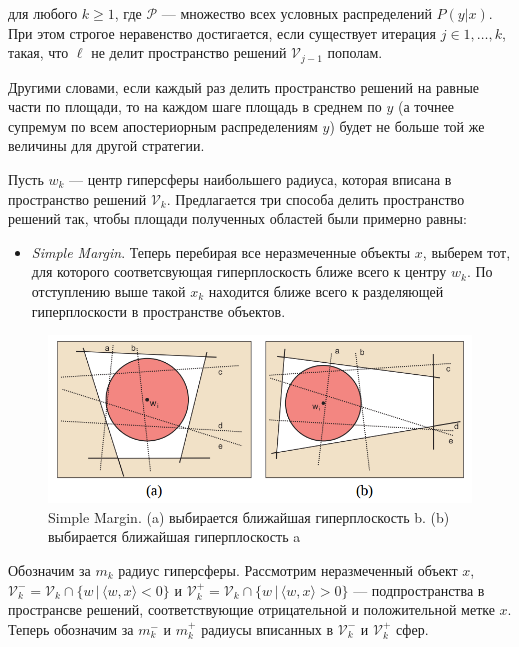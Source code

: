 \documentclass[specialist, 12pt, href]{article}
\begin{document}
для любого \(k \geq 1\), где \(\mathcal{P}\) --- множество всех условных
распределений \(P(y|x)\). При этом строгое неравенство достигается, если
существует итерация \(j \in 1,\ldots, k\), такая, что \(\ell\) не делит
пространство решений \(\mathcal{V}_{j - 1}\) пополам.

Другими словами, если каждый раз делить пространство решений на равные части по площади, то на каждом шаге площадь в среднем по $y$ (а точнее супремум по всем апостериорным распределениям $y$) будет не больше той же величины для другой стратегии.

Пусть \(w_k\) --- центр гиперсферы наибольшего радиуса, которая вписана
в пространство решений \(\mathcal{V}_k\). Предлагается три способа
делить пространство решений так, чтобы площади полученных областей были
примерно равны:

\begin{itemize}
\item
  \emph{Simple Margin}. Теперь перебирая все неразмеченные объекты
  \(x\), выберем тот, для которого соответсвующая гиперплоскость ближе
  всего к центру \(w_k\). По отступлению выше такой \(x_k\) находится
  ближе всего к разделяющей гиперплоскости в пространстве объектов.
\end{itemize}

\begin{figure}[htbp]
\centering
\includegraphics[width=5in]{img/simplemargin.png}
\caption{Simple Margin. (a) выбирается ближайшая гиперплоскость
b. (b) выбирается ближайшая гиперплоскость a}
\end{figure}

Обозначим за \(m_k\) радиус гиперсферы. Рассмотрим неразмеченный объект
\(x\), 
\(\mathcal{V}_k^- = \mathcal{V}_k \cap \{w\,|\, \langle w, x\rangle < 0\}\)
и
\(\mathcal{V}_k^+ = \mathcal{V}_k \cap \{w\,|\, \langle w, x\rangle > 0\}\) --- подпространства в
пространсве решений, соответствующие отрицательной и положительной метке
\(x\). Теперь обозначим за \(m^-_k\) и \(m^+_k\) радиусы вписанных в
\(\mathcal{V}_k^-\) и \(\mathcal{V}_k^+\) сфер.
\end{document}
